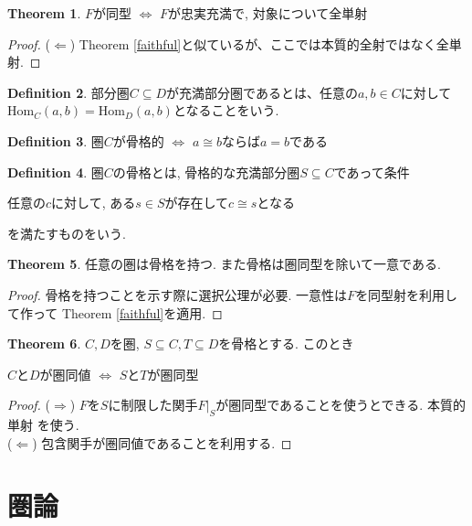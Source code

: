 \documentclass[a4paper,10pt]{article}
\theoremstyle{definition}
\newtheorem{thm}{\bfseries Theorem}[section]
\newtheorem{definition}[thm]{\bfseries Definition}
\begin{document}
\begin{thm}
    $F$が同型 $\Longleftrightarrow$
    $F$が忠実充満で, 対象について全単射
\end{thm}
\begin{proof}
($\Longleftarrow$) Theorem \ref{faithful}と似ているが、ここでは本質的全射ではなく全単射.
\end{proof}
\begin{definition}
    部分圏$C \subseteq D$が充満部分圏であるとは、任意の$a, b\in C$に対して
    $\textrm{Hom}_{C}(a,b) = \textrm{Hom}_{D}(a,b)$となることをいう.
\end{definition}
\begin{definition}
    圏$C$が骨格的 $\Longleftrightarrow$ $a \cong b$ならば$a=b$である
\end{definition}
\begin{definition}
    圏$C$の骨格とは, 骨格的な充満部分圏$S \subseteq C$であって条件
    \begin{center}
        任意の$c$に対して, ある$s\in S$が存在して$c \cong s$となる
    \end{center}
    を満たすものをいう.
\end{definition}
\begin{thm}
    任意の圏は骨格を持つ. また骨格は圏同型を除いて一意である.
\end{thm}
\begin{proof}
    骨格を持つことを示す際に選択公理が必要. 一意性は$F$を同型射を利用して作って
    Theorem \ref{faithful}を適用.
\end{proof}
\begin{thm}
    $C, D$を圏, $S \subseteq C, T \subseteq D$を骨格とする. このとき
    \begin{center}
        $C$と$D$が圏同値 $\Longleftrightarrow$ $S$と$T$が圏同型
    \end{center}
\end{thm}
\begin{proof}
    ($\Longrightarrow$) $F$を$S$に制限した関手$F|_S$が圏同型であることを使うとできる. 本質的単射
    を使う.\\
    ($\Longleftarrow$) 包含関手が圏同値であることを利用する.
\end{proof}
\section{圏論}
\end{document}
